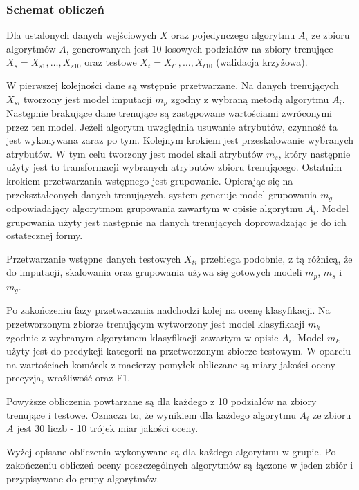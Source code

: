 \documentclass[../thesis.tex]{subfiles}
\begin{document}
\subsubsection{Schemat obliczeń}
\label{req:research_scheme}

Dla ustalonych danych wejściowych $X$ oraz pojedynczego algorytmu $A_i$ ze zbioru algorytmów $A$, generowanych jest $10$ losowych podziałów na zbiory trenujące $X_{s} = X_{s1}, \ldots, X_{s10}$ oraz testowe $X_{t} = X_{t1}, \ldots, X_{t10}$ (walidacja krzyżowa).

W pierwszej kolejności dane są wstępnie przetwarzane. Na danych trenujących $X_{si}$ tworzony jest model imputacji $m_{p}$ zgodny z wybraną metodą algorytmu $A_i$. Następnie brakujące dane trenujące są zastępowane wartościami zwróconymi przez ten model. Jeżeli algorytm uwzględnia usuwanie atrybutów, czynność ta jest wykonywana zaraz po tym. Kolejnym krokiem jest przeskalowanie wybranych atrybutów. W tym celu tworzony jest model skali atrybutów $m_{s}$, który następnie użyty jest to transformacji wybranych atrybutów zbioru trenującego. Ostatnim krokiem przetwarzania wstępnego jest grupowanie. Opierając się na przekształconych danych trenujących, system generuje model grupowania $m_{g}$ odpowiadający algorytmom grupowania zawartym w opisie algorytmu $A_i$. Model grupowania użyty jest następnie na danych trenujących doprowadzając je do ich ostatecznej formy.

Przetwarzanie wstępne danych testowych $X_{ti}$ przebiega podobnie, z tą różnicą, że do imputacji, skalowania oraz grupowania używa się gotowych modeli $m_p$, $m_s$ i $m_g$.

Po zakończeniu fazy przetwarzania nadchodzi kolej na ocenę klasyfikacji. Na przetworzonym zbiorze trenującym wytworzony jest model klasyfikacji $m_k$ zgodnie z wybranym algorytmem klasyfikacji zawartym w opisie $A_i$. Model $m_k$ użyty jest do predykcji kategorii na przetworzonym zbiorze testowym. W oparciu na wartościach komórek z macierzy pomyłek obliczane są miary jakości oceny - precyzja, wrażliwość oraz F1. 

Powyższe obliczenia powtarzane są dla każdego z 10 podziałów na zbiory trenujące i testowe. Oznacza to, że wynikiem dla każdego algorytmu $A_i$ ze zbioru $A$ jest 30 liczb - 10 trójek miar jakości oceny. 

Wyżej opisane obliczenia wykonywane są dla każdego algorytmu w grupie. Po zakończeniu obliczeń oceny poszczególnych algorytmów są łączone w jeden zbiór i przypisywane do grupy algorytmów.
\end{document}
